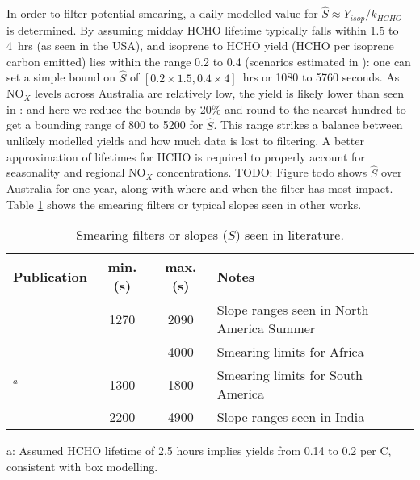     
    In order to filter potential smearing, a daily modelled value for $\hat{S} \approx Y_{isop}/k_{HCHO}$ is determined.
    By assuming midday HCHO lifetime typically falls within 1.5 to 4~hrs (as seen in the USA), and isoprene to HCHO yield (HCHO per isoprene carbon emitted) lies within the range 0.2 to 0.4 (scenarios estimated in \textcite{Palmer2003}): one can set a simple bound on $\hat{S}$ of $[0.2 \times 1.5, 0.4 \times 4]$~hrs or 1080 to 5760 seconds.
    As NO$_X$ levels across Australia are relatively low, the yield is likely lower than seen in \textcite{Palmer2003}: and here we reduce the bounds by 20\% and round to the nearest hundred to get a bounding range of 800 to 5200 for $\hat{S}$. 
    This range strikes a balance between unlikely modelled yields and how much data is lost to filtering.
    A better approximation of lifetimes for HCHO is required to properly account for seasonality and regional NO$_X$ concentrations.
    TODO: Figure todo shows $\hat{S}$ over Australia for one year, along with where and when the filter has most impact.
    Table \ref{BioIsop:method:Smearing:tab_smearing_ranges} shows the smearing filters or typical slopes seen in other works.
    
    \begin{table}\begin{threeparttable}
      \caption{Smearing filters or slopes ($S$) seen in literature.}
      \begin{tabular}{ l | c  c  >{\centering\arraybackslash}p{5cm} } 
        \toprule
        Publication & min. (s) & max. (s) & Notes \\
        \midrule
        \textcite{Palmer2003}      & 1270 & 2090 & Slope ranges seen in North America Summer \\
        \textcite{Marais2012}      &      & 4000 & Smearing limits for Africa \\
        \textcite{Barkley2013}$^a$ & 1300 & 1800 & Smearing limits for South America \\
        \textcite{Surl2018}        & 2200 & 4900 & Slope ranges seen in India \\
        
        \bottomrule
      \end{tabular}
      \begin{tablenotes} 
        \item a: Assumed HCHO lifetime of 2.5 hours implies yields from 0.14 to 0.2 per C, consistent with box modelling.
      \end{tablenotes}
      \label{BioIsop:method:Smearing:tab_smearing_ranges}
    \end{threeparttable}\end{table}
    
